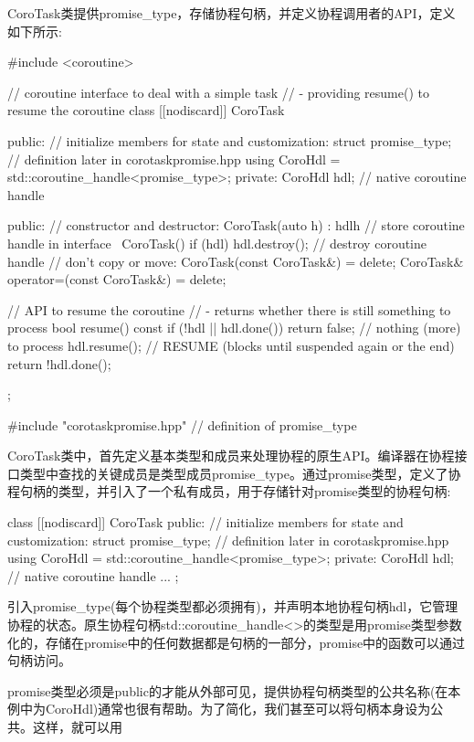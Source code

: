 
CoroTask类提供promise\_type，存储协程句柄，并定义协程调用者的API，定义如下所示:


\begin{cpp}
#include <coroutine>

// coroutine interface to deal with a simple task
// - providing resume() to resume the coroutine
class [[nodiscard]] CoroTask {
public:
	// initialize members for state and customization:
	struct promise_type; // definition later in corotaskpromise.hpp
	using CoroHdl = std::coroutine_handle<promise_type>;
	private:
	CoroHdl hdl; // native coroutine handle
	
public:
	// constructor and destructor:
	CoroTask(auto h)
	: hdl{h} { // store coroutine handle in interface
	}
	~CoroTask() {
		if (hdl) {
			hdl.destroy(); // destroy coroutine handle
		}
	}
	// don’t copy or move:
	CoroTask(const CoroTask&) = delete;
	CoroTask& operator=(const CoroTask&) = delete;
	
	// API to resume the coroutine
	// - returns whether there is still something to process
	bool resume() const {
		if (!hdl || hdl.done()) {
			return false; // nothing (more) to process
		}
		hdl.resume(); // RESUME (blocks until suspended again or the end)
		return !hdl.done();
	}
};

#include "corotaskpromise.hpp" // definition of promise_type
\end{cpp}

CoroTask类中，首先定义基本类型和成员来处理协程的原生API。编译器在协程接口类型中查找的关键成员是类型成员promise\_type。通过promise类型，定义了协程句柄的类型，并引入了一个私有成员，用于存储针对promise类型的协程句柄:

\begin{cpp}
class [[nodiscard]] CoroTask {
public:
	// initialize members for state and customization:
	struct promise_type; // definition later in corotaskpromise.hpp
	using CoroHdl = std::coroutine_handle<promise_type>;
private:
	CoroHdl hdl; // native coroutine handle
	...
};
\end{cpp}

引入promise\_type(每个协程类型都必须拥有)，并声明本地协程句柄hdl，它管理协程的状态。原生协程句柄std::coroutine\_handle<>的类型是用promise类型参数化的，存储在promise中的任何数据都是句柄的一部分，promise中的函数可以通过句柄访问。

promise类型必须是public的才能从外部可见，提供协程句柄类型的公共名称(在本例中为CoroHdl)通常也很有帮助。为了简化，我们甚至可以将句柄本身设为公共。这样，就可以用

